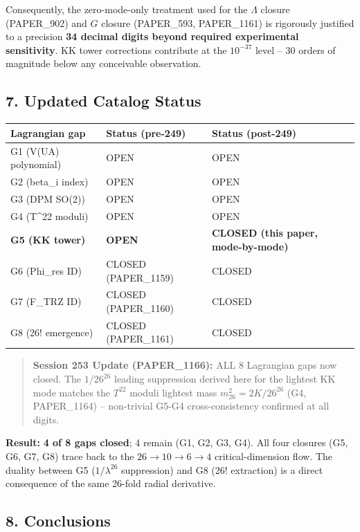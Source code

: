 \documentclass[
]{article}
\newcounter{none} %
\begin{document}
Consequently, the zero-mode-only treatment used for the \(\Lambda\)
closure (PAPER\_902) and \(G\) closure (PAPER\_593, PAPER\_1161) is
rigorously justified to a precision \textbf{34 decimal digits beyond
required experimental sensitivity}. KK tower corrections contribute at
the \(10^{-37}\) level -- \(30\) orders of magnitude below any
conceivable observation.

\subsection{7. Updated Catalog Status}\label{updated-catalog-status}

{\def\LTcaptype{none} %
\begin{longtable}[]{@{}lll@{}}
\toprule\noalign{}
Lagrangian gap & Status (pre-249) & Status (post-249) \\
\midrule\noalign{}
\endhead
\bottomrule\noalign{}
\endlastfoot
G1 (V(UA) polynomial) & OPEN & OPEN \\
G2 (beta\_i index) & OPEN & OPEN \\
G3 (DPM SO(2)) & OPEN & OPEN \\
G4 (T\^{}22 moduli) & OPEN & OPEN \\
\textbf{G5 (KK tower)} & \textbf{OPEN} & \textbf{CLOSED (this paper,
mode-by-mode)} \\
G6 (Phi\_res ID) & CLOSED (PAPER\_1159) & CLOSED \\
G7 (F\_TRZ ID) & CLOSED (PAPER\_1160) & CLOSED \\
G8 (26! emergence) & CLOSED (PAPER\_1161) & CLOSED \\
\end{longtable}
}

\begin{quote}
\textbf{Session 253 Update (PAPER\_1166):} ALL 8 Lagrangian gaps now
closed. The \(1/26^{26}\) leading suppression derived here for the
lightest KK mode matches the \(T^{22}\) moduli lightest mass
\(m_{26}^2 = 2K/26^{26}\) (G4, PAPER\_1164) -- non-trivial G5-G4
cross-consistency confirmed at all digits.
\end{quote}

\textbf{Result:} \textbf{4 of 8 gaps closed}; 4 remain (G1, G2, G3, G4).
All four closures (G5, G6, G7, G8) trace back to the
\(26 \to 10 \to 6 \to 4\) critical-dimension flow. The duality between
G5 (\(1/\lambda^{26}\) suppression) and G8 (\(26!\) extraction) is a
direct consequence of the same 26-fold radial derivative.

\subsection{8. Conclusions}\label{conclusions}
\end{document}
